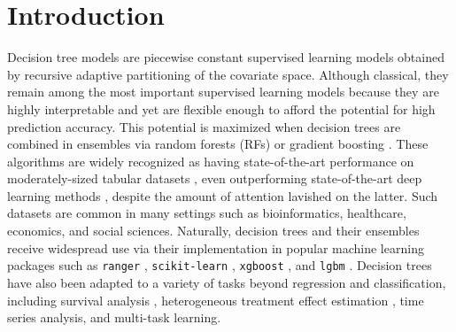 \documentclass[11pt]{article}
\begin{document}
\section{Introduction}

Decision tree models are piecewise constant supervised learning models obtained by recursive adaptive partitioning of the covariate space.
Although classical, they remain among the most important supervised learning models because they are highly interpretable \citep{rudin2021interpretable,murdoch2019definitions} and yet are flexible enough to afford the potential for high prediction accuracy. 
This potential is maximized when decision trees are combined in ensembles via random forests (RFs) \citep{breiman2001random} or gradient boosting \citep{friedman2001greedy}. 
These algorithms are widely recognized as having state-of-the-art performance on moderately-sized tabular datasets \citep{caruana2008empirical,fernandez2014we,olson2018data}, even outperforming state-of-the-art deep learning methods \citep{grinsztajn2022tree}, despite the amount of attention lavished on the latter. 
Such datasets are common in many settings such as bioinformatics, healthcare, economics, and social sciences.
Naturally, decision trees and their ensembles receive widespread use via their implementation in popular machine learning packages such as \texttt{ranger} \citep{wright2015ranger}, \texttt{scikit-learn} \citep{pedregosa2011scikit}, \texttt{xgboost} \citep{chen2016xgboost}, and \texttt{lgbm} \citep{ke2017lightgbm}.
Decision trees have also been adapted to a variety of tasks beyond regression and classification, including survival analysis \citep{ishwaran2008random}, heterogeneous treatment effect estimation \citep{athey2016recursive}, time series analysis, and multi-task learning.
\end{document}
